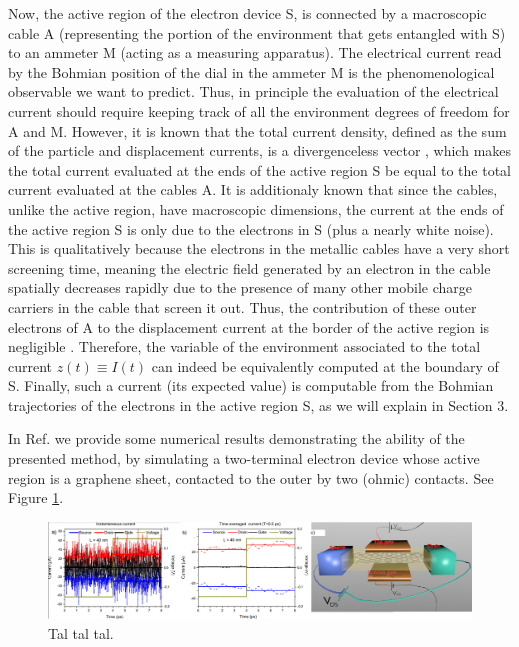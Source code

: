 \documentclass[11pt, a4paper]{article} %
\begin{document}
Now, the active region of the electron device S, is connected by a macroscopic cable A (representing the portion of the environment that gets entangled with S) to an ammeter M (acting as a measuring apparatus). The electrical current read by the Bohmian position of the dial in the ammeter M is the phenomenological observable we want to predict. Thus, in principle the evaluation of the electrical current should require keeping track of all the environment degrees of freedom for A and M. However, it is known that the total current density, defined as the sum of the particle and displacement currents, is a divergenceless vector \cite{diver1, diver2}, which makes the total current evaluated at the ends of the active region S be equal to the total current evaluated at the cables A. It is additionaly known \cite{equiv} that since the cables, unlike the active region, have macroscopic dimensions, the current at the ends of the active region S is only due to the electrons in S (plus a nearly white noise). This is qualitatively because the electrons in the metallic cables have a very short screening time, meaning the electric field generated by an electron in the cable spatially decreases rapidly due to the presence of many other mobile charge carriers in the cable that screen it out. Thus, the contribution of these outer electrons of A to the displacement current at the border of the active region is negligible \cite{neg}. Therefore, the variable of the environment associated to the total current $z(t)\equiv I(t)$ can indeed be equivalently computed at the boundary of S. Finally, such a current (its expected value) is computable from the Bohmian trajectories of the electrons in the active region S, as we will explain in Section 3. 

In Ref. \cite{Thz} we provide some numerical results demonstrating the ability of the presented method, by simulating a two-terminal electron device whose active region is a graphene sheet, contacted to the outer by two (ohmic) contacts. See Figure \ref{fig:fig}.  
\begin{figure}[h!]
  \centering
  \hspace*{-0.5cm}
    \includegraphics[width=1.05\linewidth]{Figures/abc.png}
   \caption{Tal tal tal.}
  \label{fig:fig}
\end{figure}
\end{document}
